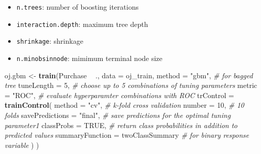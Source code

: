 \documentclass[]{book}
\newenvironment{Shaded}{\begin{snugshade}}{\end{snugshade}}
\newcommand{\CommentTok}[1]{\textcolor[rgb]{0.56,0.35,0.01}{\textit{#1}}}
\newcommand{\DataTypeTok}[1]{\textcolor[rgb]{0.13,0.29,0.53}{#1}}
\newcommand{\DecValTok}[1]{\textcolor[rgb]{0.00,0.00,0.81}{#1}}
\newcommand{\KeywordTok}[1]{\textcolor[rgb]{0.13,0.29,0.53}{\textbf{#1}}}
\newcommand{\NormalTok}[1]{#1}
\newcommand{\OperatorTok}[1]{\textcolor[rgb]{0.81,0.36,0.00}{\textbf{#1}}}
\newcommand{\OtherTok}[1]{\textcolor[rgb]{0.56,0.35,0.01}{#1}}
\newcommand{\StringTok}[1]{\textcolor[rgb]{0.31,0.60,0.02}{#1}}
\providecommand{\tightlist}{%
  \setlength{\itemsep}{0pt}\setlength{\parskip}{0pt}}
\begin{document}
\begin{itemize}
\tightlist
\item
  \texttt{n.trees}: number of boosting iterations
\item
  \texttt{interaction.depth}: maximum tree depth
\item
  \texttt{shrinkage}: shrinkage
\item
  \texttt{n.minobsinnode}: mimimum terminal node size
\end{itemize}

\begin{Shaded}
\begin{Highlighting}[]
\NormalTok{oj.gbm <-}\StringTok{ }\KeywordTok{train}\NormalTok{(Purchase }\OperatorTok{~}\StringTok{ }\NormalTok{., }
               \DataTypeTok{data =}\NormalTok{ oj_train, }
               \DataTypeTok{method =} \StringTok{"gbm"}\NormalTok{,  }\CommentTok{# for bagged tree}
               \DataTypeTok{tuneLength =} \DecValTok{5}\NormalTok{,  }\CommentTok{# choose up to 5 combinations of tuning parameters}
               \DataTypeTok{metric =} \StringTok{"ROC"}\NormalTok{,  }\CommentTok{# evaluate hyperparamter combinations with ROC}
               \DataTypeTok{trControl =} \KeywordTok{trainControl}\NormalTok{(}
                 \DataTypeTok{method =} \StringTok{"cv"}\NormalTok{,  }\CommentTok{# k-fold cross validation}
                 \DataTypeTok{number =} \DecValTok{10}\NormalTok{,  }\CommentTok{# 10 folds}
                 \DataTypeTok{savePredictions =} \StringTok{"final"}\NormalTok{,       }\CommentTok{# save predictions for the optimal tuning parameter1}
                      \DataTypeTok{classProbs =} \OtherTok{TRUE}\NormalTok{,  }\CommentTok{# return class probabilities in addition to predicted values}
                      \DataTypeTok{summaryFunction =}\NormalTok{ twoClassSummary  }\CommentTok{# for binary response variable}
\NormalTok{                      )}
\NormalTok{                    )}
\end{Highlighting}
\end{Shaded}
\end{document}
